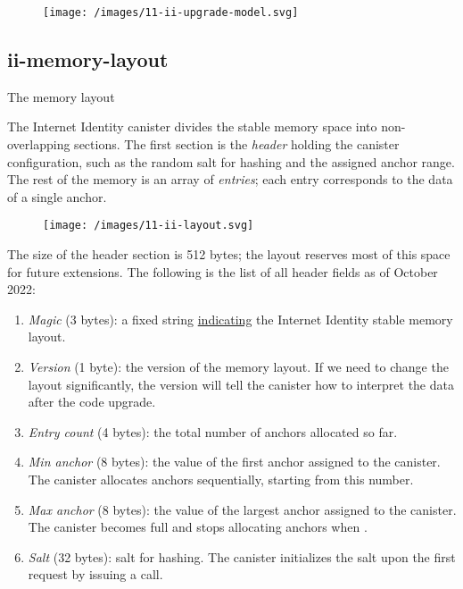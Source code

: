 \documentclass{article}
\begin{document}
\begin{figure}[grayscale-diagram]
  \texttt{[image: /images/11-ii-upgrade-model.svg]}
\end{figure}

\subsection{ii-memory-layout}{The memory layout}

The Internet Identity canister divides the stable memory space into non-overlapping sections.
The first section is the \emph{header} holding the canister configuration, such as the random salt for hashing and the assigned anchor range.
The rest of the memory is an array of \emph{entries}; each entry corresponds to the data of a single anchor.

\begin{figure}[grayscale-diagram]
  \texttt{[image: /images/11-ii-layout.svg]}
\end{figure}

The size of the header section is 512 bytes; the layout reserves most of this space for future extensions.
The following is the list of all header fields as of October 2022:
\begin{enumerate}
  \item 
    \emph{Magic} (3 bytes): a fixed string  \href{https://en.wikipedia.org/wiki/Magic_number_(programming)#Format_indicators}{indicating} the Internet Identity stable memory layout.
  \item 
    \emph{Version} (1 byte): the version of the memory layout.
    If we need to change the layout significantly, the version will tell the canister how to interpret the data after the code upgrade.
  \item 
    \emph{Entry count} (4 bytes): the total number of anchors allocated so far.
  \item 
    \emph{Min anchor} (8 bytes): the value of the first anchor assigned to the canister.
    The canister allocates anchors sequentially, starting from this number.
  \item 
    \emph{Max anchor} (8 bytes): the value of the largest anchor assigned to the canister.
    The canister becomes full and stops allocating anchors when .
  \item 
    \emph{Salt} (32 bytes): salt for hashing.
    The canister initializes the salt upon the first request by issuing a \href{https://internetcomputer.org/docs/current/references/ic-interface-spec/#ic-raw_rand}{} call.
\end{enumerate}
\end{document}
